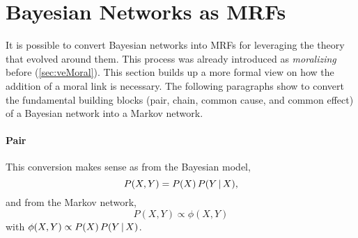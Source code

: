 	\section{Bayesian Networks as MRFs}
		\label{sec:towardsMarkovRandomFields}

		It is possible to convert Bayesian networks into MRFs for leveraging the theory that evolved around them. This process was already introduced as \emph{moralizing} before (\autoref{sec:veMoral}).	 This section builds up a more formal view on how the addition of a moral link is necessary. The following paragraphs show to convert the fundamental building blocks (pair, chain, common cause, and common effect) of a Bayesian network into a Markov network.

		\paragraph{Pair}
			\begin{center}
			\end{center}
			This conversion makes sense as from the Bayesian model,
			\begin{equation}
				P(X, Y) = P(X) \, P(Y \,\vert\, X),
			\end{equation}
			and from the Markov network,
			\begin{equation}
				P(X, Y) \propto \phi(X, Y)
			\end{equation}
			with \( \phi(X, Y) \propto P(X) \, P(Y \,\vert\, X) \).

